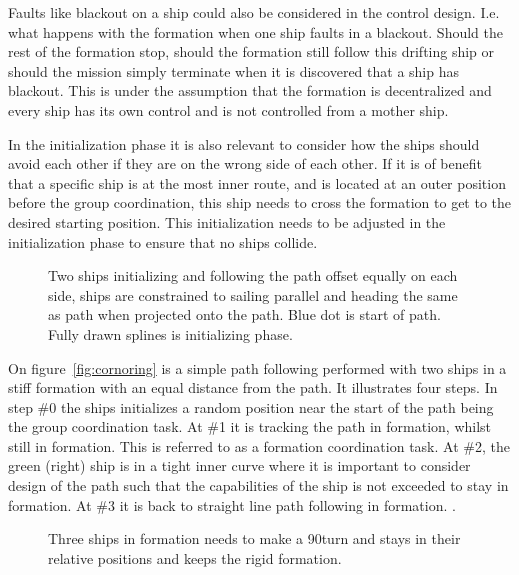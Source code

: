 Faults like blackout on a ship could also be considered in the control
design. I.e. what happens with the formation when one ship faults in a
blackout. Should the rest of the formation stop, should the formation
still follow this drifting ship or should the mission simply terminate
when it is discovered that a ship has blackout. This is under the assumption that the formation is decentralized and every ship has its own control and is not controlled from a mother ship.

In the initialization phase it is also relevant to consider how the
ships should avoid each other if they are on the wrong side of each
other. If it is of benefit that a specific ship is at the most inner route, and is located at an outer position before the group coordination, this ship needs to cross the formation to get to the desired starting position. This initialization needs to be adjusted in the initialization phase to ensure that no ships collide.

\begin{figure}[htbp]
	\centering
	
	\caption{Two ships initializing and following the path offset
		equally on each side, ships are constrained to sailing parallel
		and heading the same as path when projected onto the path. Blue
	dot is start of path. Fully drawn splines is initializing phase.}
	\label{fig:cornoring}
\end{figure}

On figure~\vref{fig:cornoring} is a simple path following performed
with two ships in a stiff formation with an equal distance from the
path. It illustrates four steps. In step \#0 the ships initializes a
random position near the start of the path being the group coordination task. At \#1 it is tracking the
path in formation, whilst still in formation. This is referred to as a formation coordination task. At \#2, the green
(right) ship is in a tight inner curve where it is important to
consider design of the path such that the capabilities of the ship is not
exceeded to stay in formation. At \#3 it is back to straight line path
following in formation. \citep{thorvaldsen}.

\begin{figure}[htbp]
	\centering
	
	\caption{Three ships in formation needs to make a 90\textdegree turn and stays in their relative positions and keeps the rigid formation.}
	\label{fig:form_rigid_90}
\end{figure}

